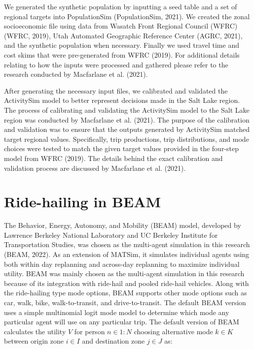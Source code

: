 \documentclass[fancy, masters]{byuthesis}
\begin{document}
We generated the synthetic population by inputting a seed table and a set of regional targets into PopulationSim (PopulationSim, 2021). We created the zonal socioeconomic file using data from Wasatch Front Regional Council (WFRC) (WFRC, 2019), Utah Automated Geographic Reference Center (AGRC, 2021), and the synthetic population when necessary. Finally we used travel time and cost skims that were pre-generated from WFRC (2019). For additional details relating to how the inputs were processed and gathered please refer to the research conducted by Macfarlane et al. (2021).

After generating the necessary input files, we calibrated and validated the ActivitySim model to better represent decisions made in the Salt Lake region. The process of calibrating and validating the ActivitySim model to the Salt Lake region was conducted by Macfarlane et al. (2021). The purpose of the calibration and validation was to ensure that the outputs generated by ActivitySim matched target regional values. Specifically, trip productions, trip distributions, and mode choices were tested to match the given target values provided in the four-step model from WFRC (2019). The details behind the exact calibration and validation process are discussed by Macfarlane et al. (2021).

\hypertarget{novel-beam}{%
\section{Ride-hailing in BEAM}\label{novel-beam}}

The Behavior, Energy, Autonomy, and Mobility (BEAM) model, developed by Lawrence Berkeley National Laboratory and UC Berkeley Institute for Transportation Studies, was chosen as the multi-agent simulation in this research (BEAM, 2022). As an extension of MATSim, it simulates individual agents using both within day replanning and across-day replanning to maximize individual utility. BEAM was mainly chosen as the multi-agent simulation in this research because of its integration with ride-hail and pooled ride-hail vehicles. Along with the ride-hailing type mode options, BEAM supports other mode options such as car, walk, bike, walk-to-transit, and drive-to-transit. The default BEAM version uses a simple multinomial logit mode model to determine which mode any particular agent will use on any particular trip. The default version of BEAM calculates the utility \(V\) for person \(n \in {1:N}\) choosing alternative mode \(k \in K\) between origin zone \(i \in I\) and destination zone \(j \in J\) as:
\end{document}
